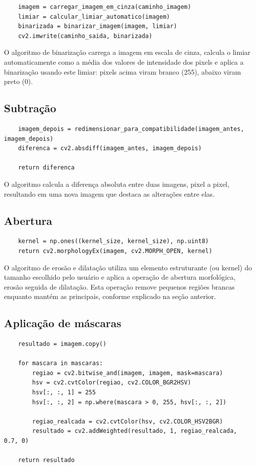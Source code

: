 \documentclass{article}
\begin{document}
\begin{verbatim}
    imagem = carregar_imagem_em_cinza(caminho_imagem)
    limiar = calcular_limiar_automatico(imagem)
    binarizada = binarizar_imagem(imagem, limiar)
    cv2.imwrite(caminho_saida, binarizada)
\end{verbatim}

O algoritmo de binarização carrega a imagem em escala de cinza, calcula o limiar automaticamente como a média dos valores de intensidade dos pixels e aplica a binarização usando este limiar: pixels acima viram branco (255), abaixo viram preto (0).

\subsection{Subtração}

\begin{verbatim}
    imagem_depois = redimensionar_para_compatibilidade(imagem_antes, imagem_depois)
    diferenca = cv2.absdiff(imagem_antes, imagem_depois)

    return diferenca
\end{verbatim}

O algoritmo calcula a diferença absoluta entre duas imagens, pixel a pixel, resultando em uma nova imagem que destaca as alterações entre elas.

\subsection{Abertura}

\begin{verbatim}
    kernel = np.ones((kernel_size, kernel_size), np.uint8)
    return cv2.morphologyEx(imagem, cv2.MORPH_OPEN, kernel)
\end{verbatim}

O algoritmo de erosão e dilatação utiliza um elemento estruturante (ou kernel) do tamanho escolhido pelo usuário e aplica a operação de abertura morfológica, erosão seguida de dilatação. Esta operação remove pequenos regiões brancas enquanto mantém as principais, conforme explicado na seção anterior.

\subsection{Aplicação de máscaras}

\begin{verbatim}
    resultado = imagem.copy()

    for mascara in mascaras:
        regiao = cv2.bitwise_and(imagem, imagem, mask=mascara)
        hsv = cv2.cvtColor(regiao, cv2.COLOR_BGR2HSV)
        hsv[:, :, 1] = 255
        hsv[:, :, 2] = np.where(mascara > 0, 255, hsv[:, :, 2])

        regiao_realcada = cv2.cvtColor(hsv, cv2.COLOR_HSV2BGR)
        resultado = cv2.addWeighted(resultado, 1, regiao_realcada, 0.7, 0)

    return resultado
\end{verbatim}
\end{document}
